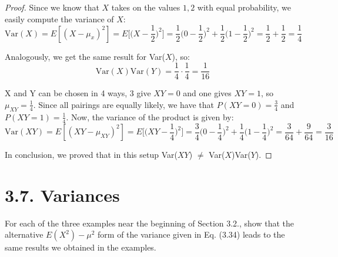 \begin{proof}
    Since we know that $X$ takes on the values $1, 2$ with equal probability, we easily compute the 
    variance of $X$: 
    \[
        \text{Var}(X) = E[(X - \mu_x)^2] = E\bigg[\bigg(X - \frac{1}{2}\bigg)^2\bigg] 
        = \frac{1}{2}\bigg(0 - \frac{1}{2}\bigg)^2  + \frac{1}{2}\bigg(1 - \frac{1}{2}\bigg)^2 
        = \frac{1}{2} + \frac{1}{2}
        = \frac{1}{4}
    \] 

    Analogously, we get the same result for Var($X$), so:
    \[
        \text{Var}(X)\text{Var}(Y) = \frac{1}{4} \cdot \frac{1}{4} = \frac{1}{16}
    \] 
    
    X and Y can be chosen in 4 ways, 3 give $XY = 0$ and one gives $XY = 1$, so $\mu_{XY} = \frac{1}{4}$.
    Since all pairings are equally likely, we have that $P(XY = 0) = \frac{3}{4}$ and
    $P(XY = 1) = \frac{1}{4}$. Now, the variance of the product is given by:
    \[
        \text{Var}(XY) = E[(XY - \mu_{XY})^2] = E\bigg[\bigg(XY - \frac{1}{4}\bigg)^2\bigg]
        = \frac{3}{4} \bigg(0 - \frac{1}{4}\bigg)^2 + \frac{1}{4} \bigg(1 - \frac{1}{4}\bigg)^2
        = \frac{3}{64} + \frac{9}{64}
        = \frac{3}{16}
    \] 

    In conclusion, we proved that in this setup Var($XY$) $\neq$ Var($X$)Var($Y$).
\end{proof}

\section*{3.7. Variances}
For each of the three examples near the beginning of Section 3.2., show that the alternative
$E(X^2) - \mu^2$ form of the variance given in Eq. (3.34) leads to the same results we obtained
in the examples.

